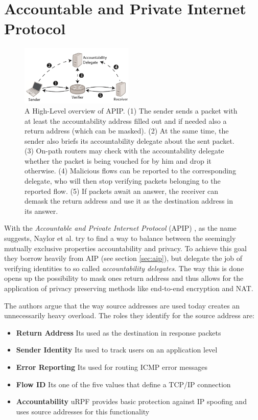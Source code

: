 \documentclass{acm_proc_article-sp}
\begin{document}

\section{Accountable and Private Internet Protocol}
\label{sec:apip}
\begin{figure}[t]
  \includegraphics[width=0.48\textwidth]{images/apipoverview.PNG}
  \caption{A High-Level overview of APIP. (1) The sender sends a packet with at least the accountability address filled out and if needed also a return address (which can be masked). (2) At the same time, the sender also briefs its accountability delegate about the sent packet. (3) On-path routers may check with the accountability delegate whether the packet is being vouched for by him and drop it otherwise. (4) Malicious flows can be reported to the corresponding delegate, who will then stop verifying packets belonging to the reported flow. (5) If packets await an answer, the receiver can demask the return address and use it as the destination address in its answer. \cite{apip}}
  \label{fig:apipoverview}
\end{figure}
With the \emph{Accountable and Private Internet Protocol} (APIP) \cite{apip}, as the name suggests, Naylor et al. try to find a way to balance between the seemingly mutually exclusive properties accountability and privacy. To achieve this goal they borrow heavily from AIP (see section \ref{sec:aip}), but delegate the job of verifying identities to so called \emph{accountability delegates}. The way this is done opens up the possibility to mask ones return address and thus allows for the application of privacy preserving methods like end-to-end encryption and NAT.

The authors argue that the way source addresses are used today creates an unnecessarily heavy overload. The roles they identify for the source address are:

\begin{itemize}
\item \textbf{Return Address} Its used as the destination in response packets
\item \textbf{Sender Identity} Its used to track users on an application level
\item \textbf{Error Reporting} Its used for routing ICMP error messages
\item \textbf{Flow ID} Its one of the five values that define a TCP/IP connection 
\item \textbf{Accountability} uRPF provides basic protection against IP spoofing and uses source addresses for this functionality
\end{itemize}
\end{document}
